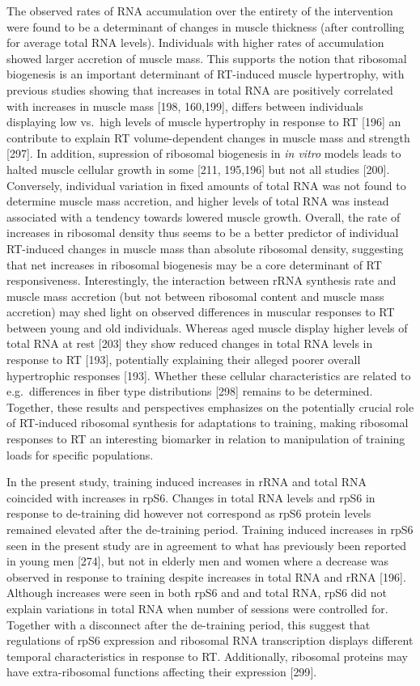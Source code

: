 \documentclass[twoside,10pt]{gihclass} %
\begin{document}
The observed rates of RNA accumulation over the entirety of the intervention were found to be a determinant of changes in muscle thickness (after controlling for average total RNA levels).
Individuals with higher rates of accumulation showed larger accretion of muscle mass.
This supports the notion that ribosomal biogenesis is an important determinant of RT-induced muscle hypertrophy, with previous studies showing that increases in total RNA are positively correlated with increases in muscle mass
{[}198, 160,199{]},
differs between individuals displaying low vs.~high levels of muscle hypertrophy in response to RT
{[}196{]}
an contribute to explain RT volume-dependent changes in muscle mass and strength
{[}297{]}.
In addition, supression of ribosomal biogenesis in \emph{in vitro} models leads to halted muscle cellular growth in some
{[}211, 195,196{]}
but not all studies
{[}200{]}.
Conversely, individual variation in fixed amounts of total RNA was not found to determine muscle mass accretion, and higher levels of total RNA was instead associated with a tendency towards lowered muscle growth.
Overall, the rate of increases in ribosomal density thus seems to be a better predictor of individual RT-induced changes in muscle mass than absolute ribosomal density, suggesting that net increases in ribosomal biogenesis may be a core determinant of RT responsiveness.
Interestingly, the interaction between rRNA synthesis rate and muscle mass accretion (but not between ribosomal content and muscle mass accretion) may shed light on observed differences in muscular responses to RT between young and old individuals.
Whereas aged muscle display higher levels of total RNA at rest
{[}203{]}
they show reduced changes in total RNA levels in response to RT
{[}193{]},
potentially explaining their alleged poorer overall hypertrophic responses {[}193{]}.
Whether these cellular characteristics are related to e.g.~differences in fiber type distributions {[}298{]} remains to be determined.
Together, these results and perspectives emphasizes on the potentially crucial role of RT-induced ribosomal synthesis for adaptations to training, making ribosomal responses to RT an interesting biomarker in relation to manipulation of training loads for specific populations.

In the present study, training induced increases in rRNA and total RNA coincided with increases in rpS6. Changes in total RNA levels and rpS6 in response to de-training did however not correspond as rpS6 protein levels remained elevated after the de-training period. Training induced increases in rpS6 seen in the present study are in agreement to what has previously been reported in young men
{[}274{]},
but not in elderly men and women where a decrease was observed in response to training despite increases in total RNA and rRNA
{[}196{]}.
Although increases were seen in both rpS6 and and total RNA, rpS6 did not explain variations in total RNA when number of sessions were controlled for. Together with a disconnect after the de-training period, this suggest that regulations of rpS6 expression and ribosomal RNA transcription displays different temporal characteristics in response to RT. Additionally, ribosomal proteins may have extra-ribosomal functions
affecting their expression
{[}299{]}.
\end{document}
